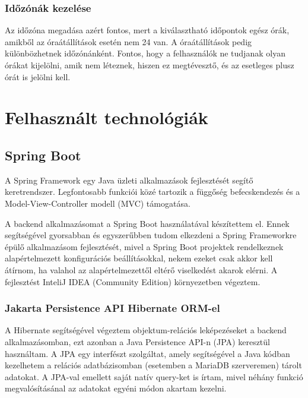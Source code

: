 \documentclass[a4paper,12pt]{report}
\theoremstyle{definition}
\theoremstyle{remark}
\begin{document}
	\subsection{Időzónák kezelése}

Az időzóna megadása azért fontos, mert a  kiválasztható időpontok egész órák, amikből az óraátállítások esetén nem 24 van. A óraátállítások pedig különbözhetnek időzónánként. Fontos, hogy a felhasználók ne tudjanak olyan órákat kijelölni, amik nem léteznek, hiszen ez megtévesztő, és az esetleges plusz órát is jelölni kell.

\chapter{Felhasznált technológiák}

\section{Spring Boot}

A Spring Framework egy Java üzleti alkalmazások fejlesztését segítő keretrendszer. Legfontosabb funkciói közé tartozik a függőség befecskendezés és a Model-View-Controller modell (MVC) támogatása.

A backend alkalmazásomat a Spring Boot\cite{Springwebsite} használatával készítettem el. Ennek segítségével gyorsabban és egyszerűbben tudom elkezdeni a Spring Frameworkre épülő alkalmazásom fejlesztését, mivel a Spring Boot projektek rendelkeznek alapértelmezett konfigurációs beállításokkal, nekem ezeket csak akkor kell átírnom, ha valahol az alapértelmezettől eltérő viselkedést akarok elérni. A fejlesztést InteliJ IDEA (Community Edition)\cite{IDEAwebsite} környezetben végeztem.

	\subsection{Jakarta Persistence API Hibernate ORM-el}

A Hibernate\cite{Hibernatewebsite} segítségével végeztem objektum-relációs leképezéseket a backend alkalmazásomban, ezt azonban a Java Persistence API-n (JPA)\cite{JPAwebsite} keresztül használtam. A JPA egy interfészt szolgáltat, amely segítségével a Java kódban kezelhetem a relációs adatbázisomban (esetemben a MariaDB szerveremen) tárolt adatokat. A JPA-val emellett saját natív query-ket is írtam, mivel néhány funkció megvalósításánal az adatokat egyéni módon akartam kezelni.
\end{document}
